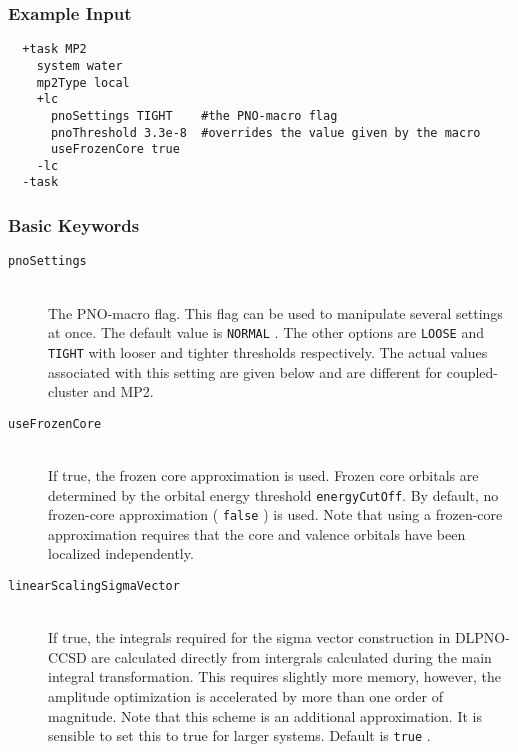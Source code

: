 \documentclass[bibliography=totocnumbered,a4paper,10pt,oneside]{scrbook}
\newcommand{\ttt}[1]{%
  \begingroup\setlength{\fboxsep}{1pt}%
  \colorbox{serenity-green!30}{\texttt{\hspace*{2pt}\vphantom{(g}#1\hspace*{2pt}}}%
  \endgroup
}
\begin{document}
\subsubsection{Example Input}
\begin{lstlisting}
  +task MP2
    system water  
    mp2Type local
    +lc 
      pnoSettings TIGHT    #the PNO-macro flag
      pnoThreshold 3.3e-8  #overrides the value given by the macro
      useFrozenCore true
    -lc 
  -task
 \end{lstlisting}
\subsubsection{Basic Keywords}
\begin{description}
  \item [\texttt{pnoSettings}]\hfill \\
  The PNO-macro flag. This flag can be used to manipulate several settings at once. The default value is
  \ttt{NORMAL}. The other options are \ttt{LOOSE} and \ttt{TIGHT} with looser and tighter thresholds
  respectively. The actual values associated with this setting are given below and are different for
  coupled-cluster and MP2.
 \item [\texttt{useFrozenCore}]\hfill \\
 If true, the frozen core approximation is used. Frozen core orbitals are determined by the orbital energy
 threshold \texttt{energyCutOff}. By default, no frozen-core approximation (\ttt{false}) is used. Note
 that using a frozen-core approximation requires that the core and valence orbitals have been localized
 independently.
 \item [\texttt{linearScalingSigmaVector}]\hfill \\
 If true, the integrals required for the sigma vector construction in DLPNO-CCSD are calculated directly from
 intergrals calculated during the main integral transformation. This requires slightly more memory, however,
 the amplitude optimization is accelerated by more than one order of magnitude. Note that this scheme is an
 additional approximation. It is sensible to set this to true for larger systems. Default is \ttt{true}.
\end{description}
\end{document}
